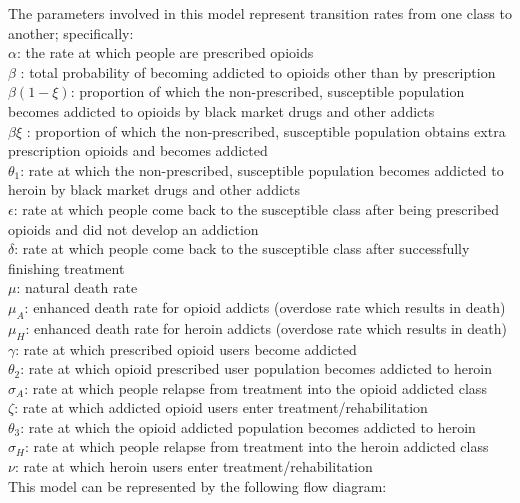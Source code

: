 \documentclass[12pt]{article}
\begin{document}
The parameters involved in this model represent transition rates from one class to another; specifically: \\
$\alpha$: the rate at which people are prescribed opioids \\
$\beta$ : total probability of becoming addicted to opioids other than by prescription \\
$\beta(1-\xi)$: proportion of which the non-prescribed, susceptible population becomes addicted to opioids by black market drugs and other addicts \\
$\beta \xi$ : proportion of which the non-prescribed, susceptible population obtains extra prescription opioids and becomes addicted  \\
$\theta_1$: rate at which the non-prescribed, susceptible population becomes addicted to heroin by black market drugs and other addicts  \\
$\epsilon$: rate at which people come back to the susceptible class after being prescribed opioids and did not develop an addiction\\
$\delta$: rate at which people come back to the susceptible class after successfully finishing treatment \\
$\mu$: natural death rate \\
$\mu_A$: enhanced death rate for opioid addicts (overdose rate which results in death) \\
$\mu_H$: enhanced death rate for heroin addicts (overdose rate which results in death) \\
$\gamma$: rate at which prescribed opioid users become addicted \\
$\theta_2$: rate at which opioid prescribed user population becomes addicted to heroin \\
$\sigma_A$: rate at which people relapse from treatment into the opioid addicted class \\
$\zeta$: rate at which addicted opioid users enter treatment/rehabilitation \\
$\theta_3$: rate at which the opioid addicted population becomes addicted to heroin \\
$\sigma_H$: rate at which people relapse from treatment into the heroin addicted class \\
$\nu$: rate at which heroin users enter treatment/rehabilitation \\ 
This model can be represented by the following flow diagram: 
\end{document}
